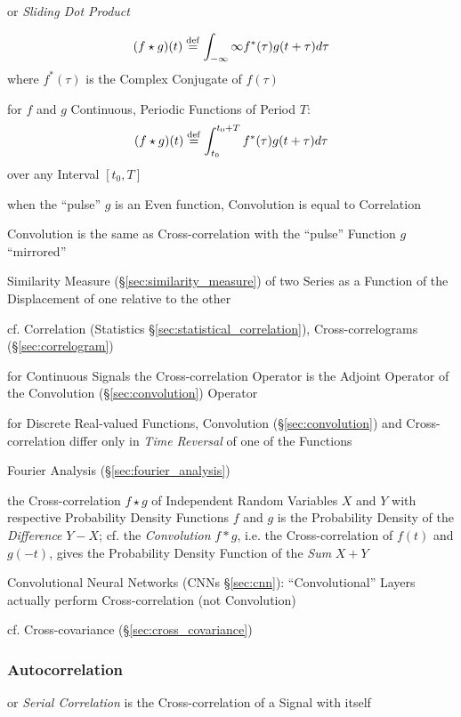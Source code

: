 or \emph{Sliding Dot Product}

\[
  (f \star g)(t) \stackrel{\mathrm{def}}=
    \int_{-\infty}{\infty}f^*(\tau) g(t + \tau) d\tau
\]
where $f^*(\tau)$ is the Complex Conjugate of $f(\tau)$

for $f$ and $g$ Continuous, Periodic Functions of Period $T$:
\[
  (f \star g)(t) \stackrel{\mathrm{def}}=
    \int_{t_0}^{t_0 + T} f^*(\tau) g(t + \tau) d\tau
\]
over any Interval $[t_0, T]$

when the ``pulse'' $g$ is an Even function, Convolution is equal to Correlation

Convolution is the same as Cross-correlation with the ``pulse'' Function $g$
``mirrored''

Similarity Measure (\S\ref{sec:similarity_measure}) of two Series as a Function
of the Displacement of one relative to the other

\fist cf. Correlation (Statistics \S\ref{sec:statistical_correlation}),
Cross-correlograms (\S\ref{sec:correlogram})

for Continuous Signals the Cross-correlation Operator is the Adjoint Operator
of the Convolution (\S\ref{sec:convolution}) Operator

for Discrete Real-valued Functions, Convolution (\S\ref{sec:convolution}) and
Cross-correlation differ only in \emph{Time Reversal} of one of the Functions

\fist Fourier Analysis (\S\ref{sec:fourier_analysis})

the Cross-correlation $f \star g$ of Independent Random Variables $X$ and $Y$
with respective Probability Density Functions $f$ and $g$ is the Probability
Density of the \emph{Difference} $Y - X$; cf. the \emph{Convolution} $f * g$,
i.e. the Cross-correlation of $f(t)$ and $g(-t)$, gives the Probability Density
Function of the \emph{Sum} $X + Y$

Convolutional Neural Networks (CNNs \S\ref{sec:cnn}): ``Convolutional'' Layers
actually perform Cross-correlation (not Convolution)

cf. Cross-covariance (\S\ref{sec:cross_covariance})



\subsubsection{Autocorrelation}\label{sec:autocorrelation}

or \emph{Serial Correlation} is the Cross-correlation of a Signal with itself

